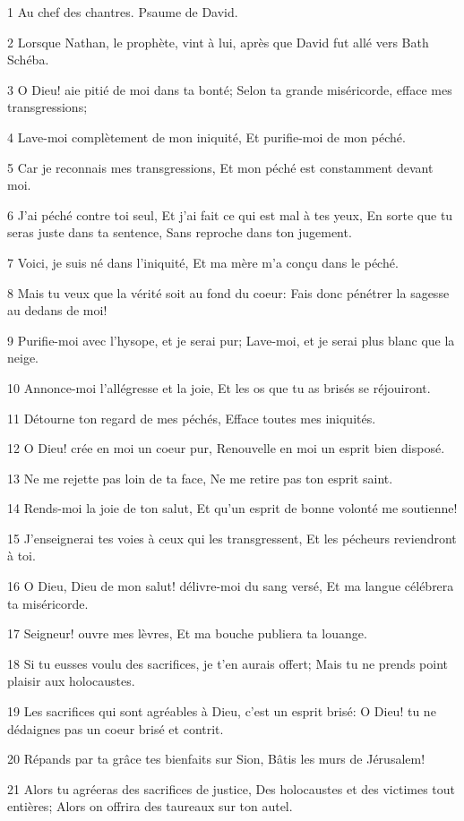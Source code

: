 \par 1 Au chef des chantres. Psaume de David.
\par 2 Lorsque Nathan, le prophète, vint à lui, après que David fut allé vers Bath Schéba.
\par 3 O Dieu! aie pitié de moi dans ta bonté; Selon ta grande miséricorde, efface mes transgressions;
\par 4 Lave-moi complètement de mon iniquité, Et purifie-moi de mon péché.
\par 5 Car je reconnais mes transgressions, Et mon péché est constamment devant moi.
\par 6 J'ai péché contre toi seul, Et j'ai fait ce qui est mal à tes yeux, En sorte que tu seras juste dans ta sentence, Sans reproche dans ton jugement.
\par 7 Voici, je suis né dans l'iniquité, Et ma mère m'a conçu dans le péché.
\par 8 Mais tu veux que la vérité soit au fond du coeur: Fais donc pénétrer la sagesse au dedans de moi!
\par 9 Purifie-moi avec l'hysope, et je serai pur; Lave-moi, et je serai plus blanc que la neige.
\par 10 Annonce-moi l'allégresse et la joie, Et les os que tu as brisés se réjouiront.
\par 11 Détourne ton regard de mes péchés, Efface toutes mes iniquités.
\par 12 O Dieu! crée en moi un coeur pur, Renouvelle en moi un esprit bien disposé.
\par 13 Ne me rejette pas loin de ta face, Ne me retire pas ton esprit saint.
\par 14 Rends-moi la joie de ton salut, Et qu'un esprit de bonne volonté me soutienne!
\par 15 J'enseignerai tes voies à ceux qui les transgressent, Et les pécheurs reviendront à toi.
\par 16 O Dieu, Dieu de mon salut! délivre-moi du sang versé, Et ma langue célébrera ta miséricorde.
\par 17 Seigneur! ouvre mes lèvres, Et ma bouche publiera ta louange.
\par 18 Si tu eusses voulu des sacrifices, je t'en aurais offert; Mais tu ne prends point plaisir aux holocaustes.
\par 19 Les sacrifices qui sont agréables à Dieu, c'est un esprit brisé: O Dieu! tu ne dédaignes pas un coeur brisé et contrit.
\par 20 Répands par ta grâce tes bienfaits sur Sion, Bâtis les murs de Jérusalem!
\par 21 Alors tu agréeras des sacrifices de justice, Des holocaustes et des victimes tout entières; Alors on offrira des taureaux sur ton autel.

